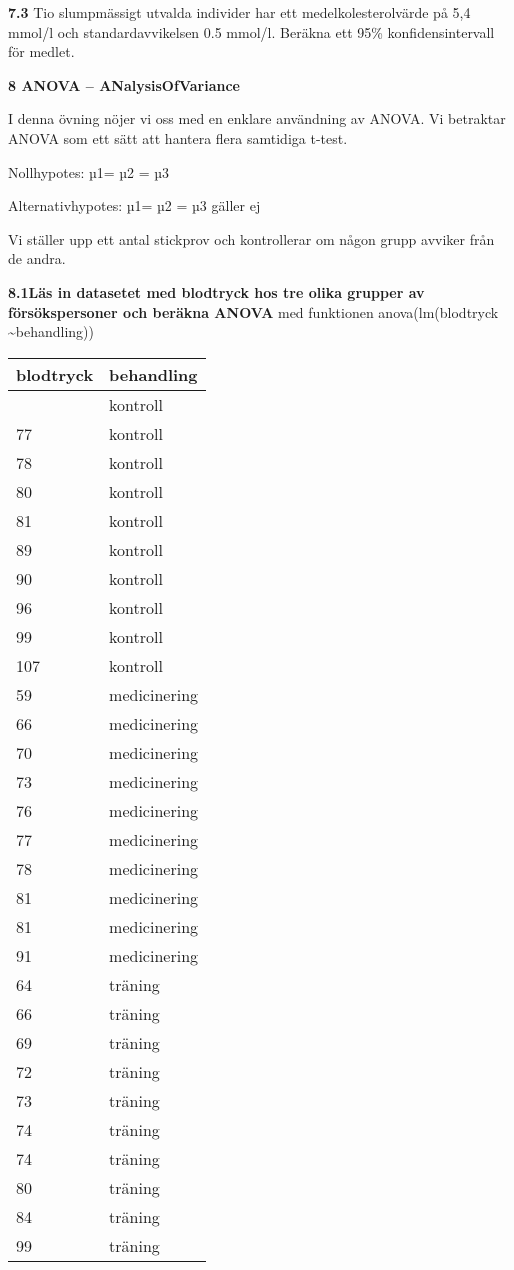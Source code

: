 \documentclass[
  letterpaper,
  DIV=11,
  numbers=noendperiod]{scrartcl}
\begin{document}
\textbf{7.3} Tio slumpmässigt utvalda individer har ett
medelkolesterolvärde på 5,4 mmol/l och standardavvikelsen 0.5 mmol/l.
Beräkna ett 95\% konfidensintervall för medlet.

\textbf{8 ANOVA -- ANalysisOfVariance}

I denna övning nöjer vi oss med en enklare användning av ANOVA. Vi
betraktar ANOVA som ett sätt att hantera flera samtidiga t-test.

Nollhypotes: µ1= µ2 = µ3

Alternativhypotes: µ1= µ2 = µ3 gäller ej

Vi ställer upp ett antal stickprov och kontrollerar om någon grupp
avviker från de andra.

\textbf{8.1Läs in datasetet med blodtryck hos tre olika grupper av
försökspersoner och beräkna ANOVA} med funktionen anova(lm(blodtryck
\textasciitilde behandling))

\begin{longtable}[]{@{}ll@{}}
\toprule\noalign{}
blodtryck & behandling \\
\midrule\noalign{}
\endhead
\bottomrule\noalign{}
\endlastfoot
77 & kontroll \\
77 & kontroll \\
78 & kontroll \\
80 & kontroll \\
81 & kontroll \\
89 & kontroll \\
90 & kontroll \\
96 & kontroll \\
99 & kontroll \\
107 & kontroll \\
59 & medicinering \\
66 & medicinering \\
70 & medicinering \\
73 & medicinering \\
76 & medicinering \\
77 & medicinering \\
78 & medicinering \\
81 & medicinering \\
81 & medicinering \\
91 & medicinering \\
64 & träning \\
66 & träning \\
69 & träning \\
72 & träning \\
73 & träning \\
74 & träning \\
74 & träning \\
80 & träning \\
84 & träning \\
99 & träning \\
\end{longtable}
\end{document}
